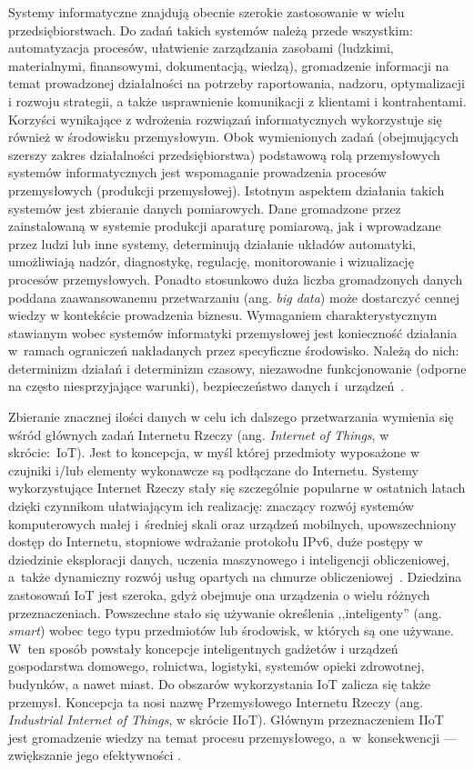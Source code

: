 \documentclass[a4paper, 12pt, twoside]{article}
\begin{document}
Systemy informatyczne znajdują obecnie szerokie zastosowanie w wielu przedsiębiorstwach.
Do zadań takich systemów należą przede wszystkim: automatyzacja procesów,
ułatwienie zarządzania zasobami (ludzkimi, materialnymi, finansowymi, dokumentacją, wiedzą),
gromadzenie informacji na temat prowadzonej
działalności na potrzeby raportowania, nadzoru, optymalizacji i rozwoju strategii, a także
usprawnienie komunikacji z klientami i kontrahentami. Korzyści wynikające z wdrożenia
rozwiązań informatycznych wykorzystuje się również w środowisku
przemysłowym. Obok wymienionych zadań (obejmujących szerszy zakres działalności
przedsiębiorstwa) podstawową rolą przemysłowych systemów informatycznych
jest wspomaganie prowadzenia procesów przemysłowych (produkcji przemysłowej).
Istotnym aspektem działania takich systemów
jest zbieranie danych pomiarowych. Dane gromadzone przez zainstalowaną w systemie produkcji
aparaturę pomiarową, jak i wprowadzane przez ludzi lub inne systemy, determinują działanie układów automatyki,
umożliwiają nadzór, diagnostykę, regulację, monitorowanie i wizualizację procesów przemysłowych.
Ponadto stosunkowo duża liczba gromadzonych danych poddana zaawansowanemu przetwarzaniu
(ang. \emph{big data})
może dostarczyć cennej wiedzy w kontekście prowadzenia biznesu.
Wymaganiem charakterystycznym stawianym wobec systemów informatyki przemysłowej
jest konieczność działania w~ramach ograniczeń nakładanych przez specyficzne środowisko.
Należą do nich: determinizm działań i determinizm czasowy, niezawodne funkcjonowanie (odporne
na często niesprzyjające warunki), bezpieczeństwo danych i~urządzeń~\cite{isp}.

Zbieranie znacznej ilości danych w celu ich dalszego przetwarzania wymienia się
wśród głównych zadań Internetu Rzeczy (ang. \emph{Internet of Things}, w skrócie:~IoT).
Jest to koncepcja, w myśl której przedmioty wyposażone w czujniki i/lub elementy
wykonawcze są podłączane do Internetu. Systemy wykorzystujące Internet Rzeczy stały się szczególnie popularne
w ostatnich latach dzięki czynnikom ułatwiającym ich realizację:
znaczący rozwój systemów komputerowych małej i~średniej skali oraz urządzeń mobilnych, upowszechniony
dostęp do Internetu, stopniowe wdrażanie protokołu IPv6, duże postępy w dziedzinie
eksploracji danych, uczenia maszynowego i inteligencji obliczeniowej,
a~także dynamiczny rozwój usług opartych na chmurze obliczeniowej~\cite{intro-to-iot}.
Dziedzina zastosowań IoT jest szeroka, gdyż obejmuje ona urządzenia
o wielu różnych przeznaczeniach. Powszechne stało się używanie określenia ,,inteligenty''
(ang. \emph{smart}) wobec tego typu przedmiotów lub środowisk, w których są one używane.  W~ten sposób
powstały koncepcje inteligentnych gadżetów i urządzeń gospodarstwa domowego,
rolnictwa, logistyki, systemów opieki zdrowotnej, budynków, a nawet miast.
Do obszarów wykorzystania IoT zalicza się także przemysł. Koncepcja ta nosi
nazwę Przemysłowego Internetu Rzeczy (ang. \emph{Industrial Internet of Things}, w skrócie IIoT).
Głównym przeznaczeniem IIoT jest gromadzenie wiedzy na temat procesu przemysłowego,
a~w~konsekwencji --- zwiększanie jego efektywności \cite{iiot-challenges-opportunities-directions}.
\end{document}
